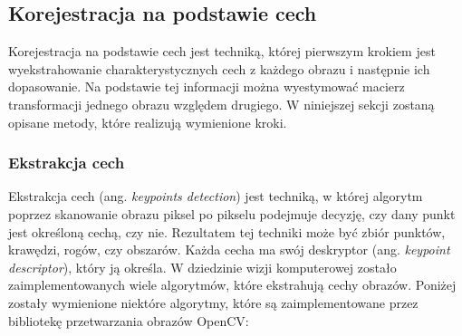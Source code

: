 \subsection{Korejestracja na podstawie cech}
\label{sec:algorytmy_korejestracji:korejestracja_na_podstawie_cech}

Korejestracja na podstawie cech jest techniką, której pierwszym krokiem jest wyekstrahowanie charakterystycznych cech z każdego obrazu i następnie ich dopasowanie. Na podstawie tej informacji można wyestymować macierz transformacji jednego obrazu względem drugiego. W niniejszej sekcji zostaną opisane metody, które realizują wymienione kroki.

\subsubsection{Ekstrakcja cech}

Ekstrakcja cech (ang. \textit{keypoints detection}) jest techniką, w której algorytm poprzez skanowanie obrazu piksel po pikselu podejmuje decyzję, czy dany punkt jest określoną cechą, czy nie. Rezultatem tej techniki może być zbiór punktów, krawędzi, rogów, czy obszarów. Każda cecha ma swój deskryptor (ang. \textit{keypoint descriptor}), który ją określa. W dziedzinie wizji komputerowej zostało zaimplementowanych wiele algorytmów, które ekstrahują cechy obrazów. Poniżej zostały wymienione niektóre algorytmy, które są zaimplementowane przez bibliotekę przetwarzania obrazów OpenCV:

